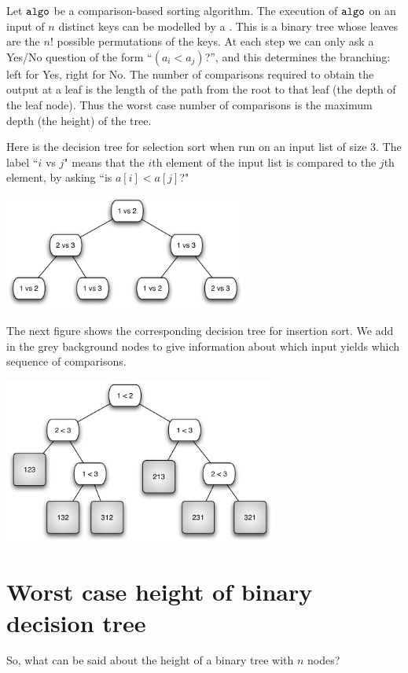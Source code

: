 Let $\operatorname{\text{\texttt{algo}}}$ be a comparison-based sorting algorithm. 
The execution of $\operatorname{\text{\texttt{algo}}}$ on an input of $n$ distinct keys can be modelled by a . 
This is a binary tree whose leaves are the $n!$ possible permutations of the keys. 
At each step we can only ask a Yes/No question of the form ``$(a_i < a_j)$?'', and this determines the branching: 
left for Yes, right for No. 
The number of comparisons required to obtain the output at a leaf is the 
length of the path from the root to that leaf (the depth of the leaf node). 
Thus the worst case number of comparisons is the maximum depth (the height) of the tree.

\begin{Boxample}
Here is the decision tree for selection sort when run on an  input list of size $3$. The label 
``$i$ vs $j$" means that the $i$th element of the input list is compared to the $j$th element, by asking
``is $a[i] < a[j]$?"
\begin{center}
\includegraphics[width=8cm]{figs/selsort-dt}
\end{center}

The next figure shows the corresponding decision tree for insertion sort. 
We add in the grey background nodes to give information about 
which input yields which sequence of comparisons.
\begin{center}
\includegraphics[width=9cm]{figs/insort-dt}
\end{center} 
\end{Boxample}

\section{Worst case height of binary decision tree} 
So, what can be said about the height of a binary tree with 
$n$ nodes?


